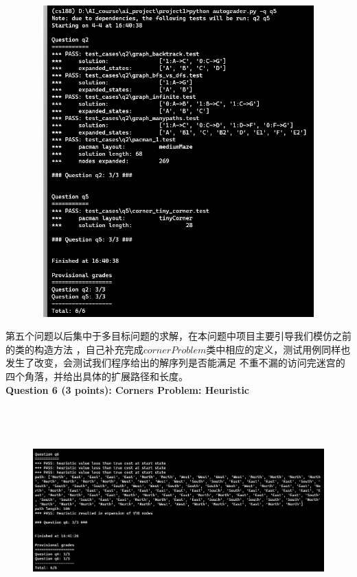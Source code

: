 \documentclass[a4paper,12pt,UTF8]{article}
\begin{document}
\begin{flushleft}
{\begin{figure}[h]
        \includegraphics[width=12cm,height=12cm]{5.png}
    \end{figure}
    \normalsize{
        \hspace{1cm}第五个问题以后集中于多目标问题的求解，在本问题中项目主要引导我们模仿之前的类的构造方法
        ，自己补充完成$cornerProblem$类中相应的定义，测试用例同样也发生了改变，会测试我们程序给出的解序列是否能满足
        不重不漏的访问完迷宫的四个角落，并给出具体的扩展路径和长度。\\
    }
    \newpage
    \large{
        \hspace{1cm}\textbf{
            Question 6 (3 points): Corners Problem: Heuristic\\
        }
    }
    \begin{figure}[h]
        \centering
        \includegraphics[width=12cm,height=8cm]{6.png}

\end{figure}}
\end{flushleft}
\end{document}
